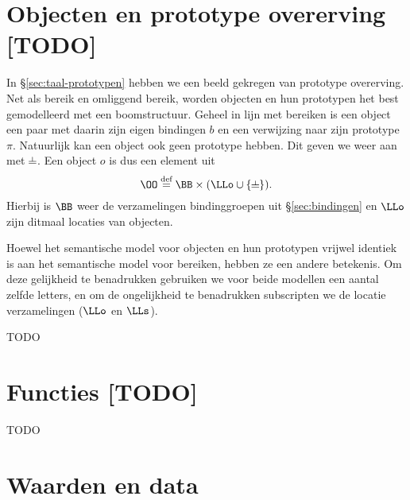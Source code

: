 \section{Objecten en prototype overerving [TODO]}
\label{sec:sem-objecten}

In §\ref{sec:taal-prototypen} hebben we een beeld gekregen van prototype overerving. Net als bereik en omliggend bereik, worden objecten en hun prototypen het best gemodelleerd met een boomstructuur. Geheel in lijn met bereiken is een object een paar met daarin zijn eigen bindingen $b$ en een verwijzing naar zijn prototype $\pi$. Natuurlijk kan een object ook geen prototype hebben. Dit geven we weer aan met $\nil$. Een object $o$ is dus een element uit
%
\begin{equation*}
  \OO \DEF \BB \times (\LLo \cup \{\nil\}).
\end{equation*}
%
Hierbij is $\BB$ weer de verzamelingen bindinggroepen uit §\ref{sec:bindingen} en $\LLo$ zijn ditmaal locaties van objecten.

Hoewel het semantische model voor objecten en hun prototypen vrijwel identiek is aan het semantische model voor bereiken, hebben ze een andere betekenis. Om deze gelijkheid te benadrukken gebruiken we voor beide modellen een aantal zelfde letters, en om de ongelijkheid te benadrukken subscripten we de locatie verzamelingen ($\LLo$ en $\LLs$).

TODO

\section{Functies [TODO]}
\label{sec:sem-functies}

TODO

\section{Waarden en data}
\label{sec:waarden}

